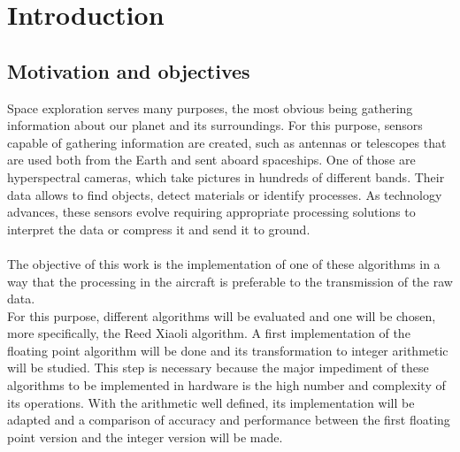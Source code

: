 \cleardoublepage
\chapter{Introduction}
\label{makereference}

\section{Motivation and objectives}
Space exploration serves many purposes, the most obvious being gathering information about our planet and its surroundings. For this purpose, sensors capable of gathering information are created, such as antennas or telescopes that are used both from the Earth and sent aboard spaceships. One of those are hyperspectral cameras, which take pictures in hundreds of different bands. Their data allows to find objects, detect materials or identify processes. As technology advances, these sensors evolve requiring appropriate processing solutions to interpret the data or compress it and send it to ground.
\\
\\
The objective of this work is the implementation of one of these algorithms in a way that the processing in the aircraft is preferable to the transmission of the raw data.
\\
For this purpose, different algorithms will be evaluated and one will be chosen, more specifically, the Reed Xiaoli algorithm. A first implementation of the floating point algorithm will be done and its transformation to integer arithmetic will be studied. This step is necessary because the major impediment of these algorithms to be implemented in hardware is the high number and complexity of its operations. With the arithmetic well defined, its implementation will be adapted and a comparison of accuracy and performance between the first floating point version and the integer version will be made.

